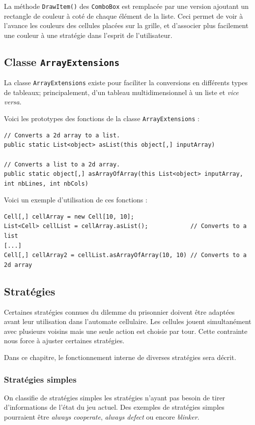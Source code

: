 \documentclass[a4paper, french]{article}
\begin{document}
La méthode \texttt{DrawItem()} des \texttt{ComboBox} est remplacée par une version ajoutant un rectangle de couleur à coté de chaque élément de la liste. Ceci permet de voir à l'avance les couleurs des cellules placées sur la grille, et d'associer plus facilement une couleur à une stratégie dans l'esprit de l'utilisateur.

\subsection{Classe \texttt{ArrayExtensions}}
La classe \texttt{ArrayExtensions} existe pour faciliter la conversions en différents types de tableaux; principalement, d'un tableau multidimensionnel à un liste et \textit{vice versa}.

Voici les prototypes des fonctions de la classe \texttt{ArrayExtensions} : 

\begin{lstlisting}
// Converts a 2d array to a list.
public static List<object> asList(this object[,] inputArray)

// Converts a list to a 2d array.
public static object[,] asArrayOfArray(this List<object> inputArray, int nbLines, int nbCols)
\end{lstlisting}

Voici un exemple d'utilisation de ces fonctions :
\begin{lstlisting}
Cell[,] cellArray = new Cell[10, 10];
List<Cell> cellList = cellArray.asList();            // Converts to a list
[...]
Cell[,] cellArray2 = cellList.asArrayOfArray(10, 10) // Converts to a 2d array
\end{lstlisting}

\pagebreak
\subsection{Stratégies}
Certaines stratégies connues du dilemme du prisonnier doivent être adaptées avant leur utilisation dans l'automate cellulaire. Les cellules jouent simultanément avec plusieurs voisins mais une seule action est choisie par tour. Cette contrainte nous force à ajuster certaines stratégies.

Dans ce chapitre, le fonctionnement interne de diverses stratégies sera décrit.

\subsubsection{Stratégies simples}
On classifie de stratégies simples les stratégies n'ayant pas besoin de tirer d'informations de l'état du jeu actuel. Des exemples de stratégies simples pourraient être \textit{always cooperate}, \textit{always defect} ou encore \textit{blinker}.
\end{document}

